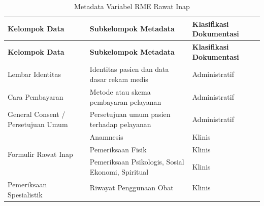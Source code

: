 \begin{longtable}{|p{4cm}|p{5.2cm}|p{3.2cm}|}
	\caption{Metadata Variabel RME Rawat Inap}
	\label{tab:metadata-rme-rawat-inap}                                                                   \\
	\hline
	\textbf{Kelompok Data}        &
	\textbf{Subkelompok Metadata} &
	\textbf{Klasifikasi Dokumentasi}                                                                      \\ \hline
	\endfirsthead

	\hline
	\textbf{Kelompok Data}        &
	\textbf{Subkelompok Metadata} &
	\textbf{Klasifikasi Dokumentasi}                                                                      \\ \hline
	\endhead

	Lembar Identitas
	                              & Identitas pasien dan data dasar rekam medis
	                              & Administratif                                                         \\ \hline

	Cara Pembayaran
	                              & Metode atau skema pembayaran pelayanan
	                              & Administratif                                                         \\ \hline

	General Consent / Persetujuan Umum
	                              & Persetujuan umum pasien terhadap pelayanan
	                              & Administratif                                                         \\ \hline

	\multirow{3}{4cm}{Formulir Rawat Inap}
	                              & Anamnesis
	                              & Klinis                                                                \\ \cline{2-3}

	                              & Pemeriksaan Fisik
	                              & Klinis                                                                \\ \cline{2-3}

	                              & Pemeriksaan Psikologis, Sosial Ekonomi, Spiritual
	                              & Klinis                                                                \\ \hline

	\multirow{10}{4cm}{Pemeriksaan Spesialistik}
	                              & Riwayat Penggunaan Obat
	                              & Klinis                                                                \\ \cline{2-3}


\end{longtable}
